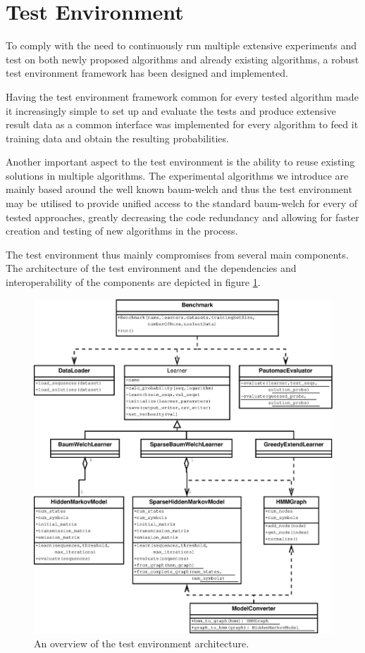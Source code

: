 \section{Test Environment}

To comply with the need to continuously run multiple extensive experiments and test on both newly proposed algorithms and already existing algorithms, a robust test environment framework has been designed and implemented.

Having the test environment framework common for every tested algorithm made it increasingly simple to set up and evaluate the tests and produce extensive result data as a common interface was implemented for every algorithm to feed it training data and obtain the resulting probabilities.

Another important aspect to the test environment is the ability to reuse existing solutions in multiple algorithms. The experimental algorithms we introduce are mainly based around the well known \gls{baum-welch} and thus the test environment may be utilised to provide unified access to the standard \gls{baum-welch} for every of tested approaches, greatly decreasing the code redundancy and allowing for faster creation and testing of new algorithms in the process.

The test environment thus mainly compromises from several main components. The architecture of the test environment and the dependencies and interoperability of the components are depicted in figure \ref{fig:testenvironment}.

\begin{figure}[!htb]
\centering
\includegraphics[scale=.4]{pictures/test-environment-overview.eps}
\caption{An overview of the test environment architecture.}
\label{fig:testenvironment}
\end{figure}


